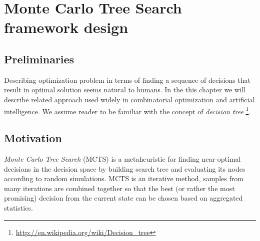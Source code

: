 \chapter{Monte Carlo Tree Search framework design}

\section{Preliminaries}
Describing optimization problem in terms of finding a sequence of decisions
that result in optimal solution seems natural to humans. In the this chapter we
will describe related approach used widely in combinatorial optimization and
artificial intelligence. We assume reader to be familiar with the concept of
\emph{decision tree}
\footnote{\url{http://en.wikipedia.org/wiki/Decision_tree}}.

\section{Motivation}
\emph{Monte Carlo Tree Search} (MCTS) is a metaheuristic for finding
near-optimal decisions in the decision space by building search tree and
evaluating its nodes according to random simulations.
MCTS is an iterative method, samples from many iterations are combined together
so that the best (or rather the most promising) decision from the current state
can be chosen based on aggregated statistics.

